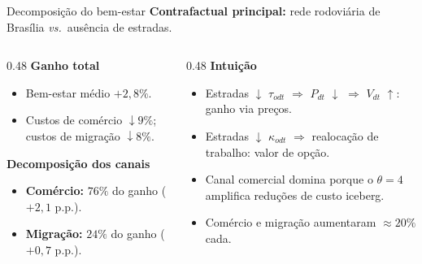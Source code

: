 \begin{frame}{Decomposição do bem-estar}
    \textbf{Contrafactual principal:} rede rodoviária de Brasília \textit{vs.}\ ausência de estradas.

    \vspace{0.25cm}

    \begin{columns}[T]
        \begin{column}{0.48\textwidth}
            \textbf{Ganho total}
            \begin{itemize}
                \item Bem-estar médio $+2{,}8\%$.
                \item Custos de comércio $\downarrow 9\%$; custos de migração $\downarrow 8\%$.
            \end{itemize}

            \vspace{0.2cm}

            \textbf{Decomposição dos canais}
            \begin{itemize}
                \item \textbf{Comércio:} $76\%$ do ganho ($+2{,}1$ p.p.).
                \item \textbf{Migração:} $24\%$ do ganho ($+0{,}7$ p.p.).
            \end{itemize}
        \end{column}
        \begin{column}{0.48\textwidth}
            \textbf{Intuição}
            \begin{itemize}
                \item Estradas $\downarrow$ $\tau_{odt}$ $\Rightarrow$ $P_{dt}$ $\downarrow$ $\Rightarrow$ $V_{dt}$ $\uparrow$: ganho via preços.
                \item Estradas $\downarrow$ $\kappa_{odt}$ $\Rightarrow$ realocação de trabalho: valor de opção.
                \item Canal comercial domina porque o $\theta = 4$ amplifica reduções de custo iceberg.
                \item Comércio e migração aumentaram $\approx 20\%$ cada.
            \end{itemize}
        \end{column}
    \end{columns}

    \vspace{0.2cm}
\end{frame}

